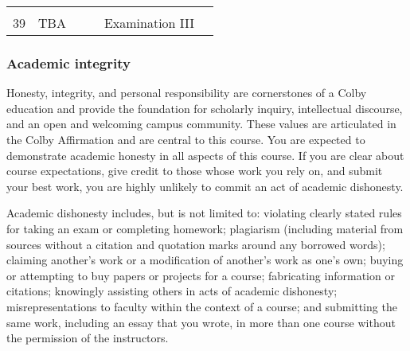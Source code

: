 \documentclass[]{article}
\begin{document}
\begin{longtable}[]{@{}ccclll@{}}
\begin{minipage}[t]{0.12\columnwidth}
\strut
\end{minipage}\tabularnewline
\begin{minipage}[t]{0.13\columnwidth}\centering\strut
39\strut
\end{minipage} & \begin{minipage}[t]{0.08\columnwidth}\centering\strut
{TBA}\strut
\end{minipage} & \begin{minipage}[t]{0.07\columnwidth}\centering\strut
\strut
\end{minipage} & \begin{minipage}[t]{0.10\columnwidth}\raggedright\strut
\strut
\end{minipage} & \begin{minipage}[t]{0.12\columnwidth}\raggedright\strut
Examination III\strut
\end{minipage} & \begin{minipage}[t]{0.12\columnwidth}\raggedright\strut
\strut
\end{minipage}\tabularnewline
\bottomrule
\end{longtable}

\subsubsection{Academic integrity }\label{academic-integrity}

Honesty, integrity, and personal responsibility are cornerstones of a
Colby education and provide the foundation for scholarly inquiry,
intellectual discourse, and an open and welcoming campus community.
These values are articulated in the Colby Affirmation and are central to
this course. You are expected to demonstrate academic honesty in all
aspects of this course. If you are clear about course expectations, give
credit to those whose work you rely on, and submit your best work, you
are highly unlikely to commit an act of academic dishonesty.

Academic dishonesty includes, but is not limited to: violating clearly
stated rules for taking an exam or completing homework; plagiarism
(including material from sources without a citation and quotation marks
around any borrowed words); claiming another's work or a modification of
another's work as one's own; buying or attempting to buy papers or
projects for a course; fabricating information or citations; knowingly
assisting others in acts of academic dishonesty; misrepresentations to
faculty within the context of a course; and submitting the same work,
including an essay that you wrote, in more than one course without the
permission of the instructors.
\end{document}
